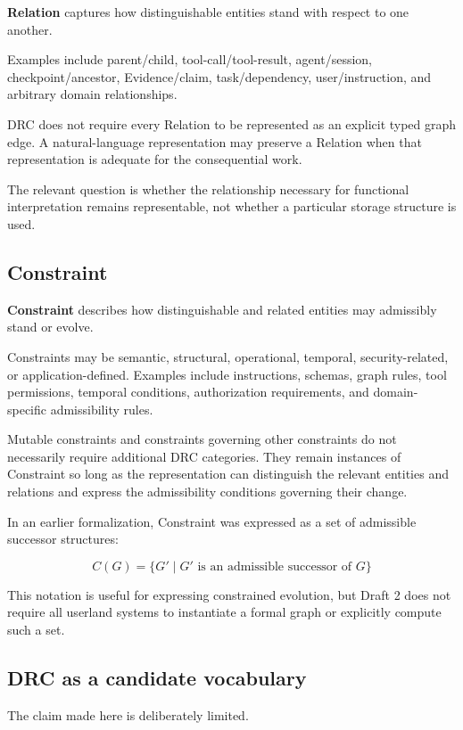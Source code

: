 \documentclass[11pt]{article}
\begin{document}
\textbf{Relation} captures how distinguishable entities stand with respect to one another.

Examples include parent/child, tool-call/tool-result, agent/session, checkpoint/ancestor, Evidence/claim, task/dependency, user/instruction, and arbitrary domain relationships.

DRC does not require every Relation to be represented as an explicit typed graph edge. A natural-language representation may preserve a Relation when that representation is adequate for the consequential work.

The relevant question is whether the relationship necessary for functional interpretation remains representable, not whether a particular storage structure is used.

\subsection{Constraint}

\textbf{Constraint} describes how distinguishable and related entities may admissibly stand or evolve.

Constraints may be semantic, structural, operational, temporal, security-related, or application-defined. Examples include instructions, schemas, graph rules, tool permissions, temporal conditions, authorization requirements, and domain-specific admissibility rules.

Mutable constraints and constraints governing other constraints do not necessarily require additional DRC categories. They remain instances of Constraint so long as the representation can distinguish the relevant entities and relations and express the admissibility conditions governing their change.

In an earlier formalization, Constraint was expressed as a set of admissible successor structures:

\[
C(G) = \{G' \mid G' \text{ is an admissible successor of } G\}
\]

This notation is useful for expressing constrained evolution, but Draft 2 does not require all userland systems to instantiate a formal graph or explicitly compute such a set.

\subsection{DRC as a candidate vocabulary}

The claim made here is deliberately limited.
\end{document}
